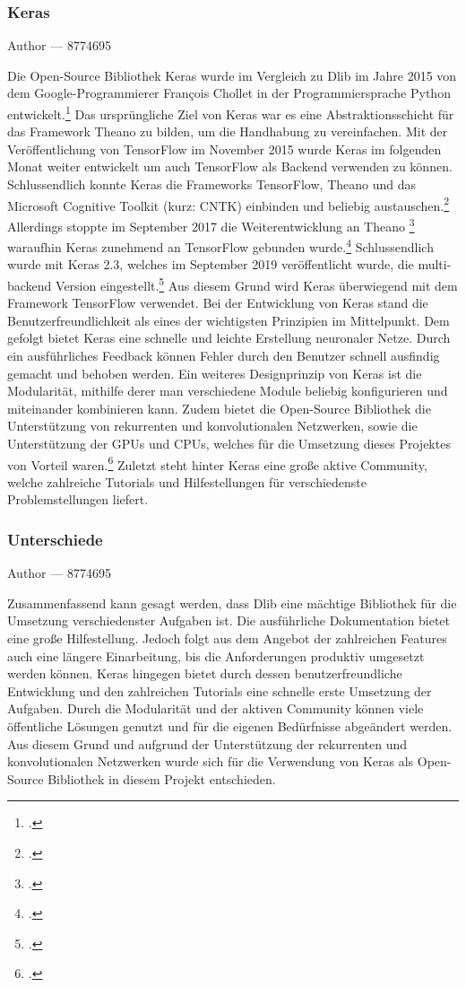 \documentclass[12pt, a4paper]{report}
\makeatletter
\newcommand{\sectionauthor}[1]{%
  {\parindent0pt\vspace*{-5pt}%
  \large{Author --- }
  \linespread{1.1}\large\scshape#1%
  \par\nobreak\vspace*{35pt} }
  \@afterheading%
}
\makeatother
\begin{document}
\subsubsection{Keras}
\sectionauthor{8774695}
Die Open-Source Bibliothek Keras wurde im Vergleich zu Dlib im Jahre 2015 von dem Google-Programmierer François Chollet in der Programmiersprache Python entwickelt.\footcite[Vgl.][]{Keras}
Das ursprüngliche Ziel von Keras war es eine Abstraktionsschicht für das Framework Theano zu bilden, um die Handhabung zu vereinfachen. Mit der Veröffentlichung von TensorFlow im November 2015 wurde Keras im folgenden Monat weiter entwickelt um auch TensorFlow als Backend verwenden zu können. Schlussendlich konnte Keras die Frameworks TensorFlow, Theano und das Microsoft Cognitive Toolkit (kurz: CNTK) einbinden und beliebig austauschen.\footcite[Vgl.][]{Keras3} Allerdings stoppte im September 2017 die Weiterentwicklung an Theano
\footcite[Vgl.][]{Theano}
 waraufhin Keras zunehmend an TensorFlow gebunden wurde.\footcite[Vgl.][]{Keras4} Schlussendlich wurde mit Keras 2.3, welches im September 2019 veröffentlicht wurde, die multi-backend Version eingestellt.\footcite[Vgl.][]{Keras5} Aus diesem Grund wird Keras überwiegend mit dem Framework TensorFlow verwendet.
\newline
Bei der Entwicklung von Keras stand die Benutzerfreundlichkeit als eines der wichtigsten Prinzipien im Mittelpunkt. Dem gefolgt bietet Keras eine schnelle und leichte Erstellung neuronaler Netze. Durch ein ausführliches Feedback können Fehler durch den Benutzer schnell ausfindig gemacht und behoben werden. Ein weiteres Designprinzip von Keras ist die Modularität, mithilfe derer man verschiedene Module beliebig konfigurieren und miteinander kombinieren kann. Zudem bietet die Open-Source Bibliothek die Unterstützung von rekurrenten und konvolutionalen Netzwerken, sowie die Unterstützung der GPUs und CPUs, welches für die Umsetzung dieses Projektes von Vorteil waren.\footcite[Vgl.][]{Keras2}
Zuletzt steht hinter Keras eine große aktive Community, welche zahlreiche Tutorials und Hilfestellungen für verschiedenste Problemstellungen liefert.


\subsubsection{Unterschiede}
\sectionauthor{8774695}
Zusammenfassend kann gesagt werden, dass Dlib eine mächtige Bibliothek für die Umsetzung verschiedenster Aufgaben ist. Die ausführliche Dokumentation bietet eine große Hilfestellung. Jedoch folgt aus dem Angebot der zahlreichen Features auch eine längere Einarbeitung, bis die Anforderungen produktiv umgesetzt werden können.\newline
Keras hingegen bietet durch dessen benutzerfreundliche Entwicklung und den zahlreichen Tutorials eine schnelle erste Umsetzung der Aufgaben. Durch die Modularität und der aktiven Community können viele öffentliche Lösungen genutzt und für die eigenen Bedürfnisse abgeändert werden. 
Aus diesem Grund und aufgrund der Unterstützung der rekurrenten und konvolutionalen Netzwerken wurde sich für die Verwendung von Keras als Open-Source Bibliothek in diesem Projekt entschieden.
\end{document}
